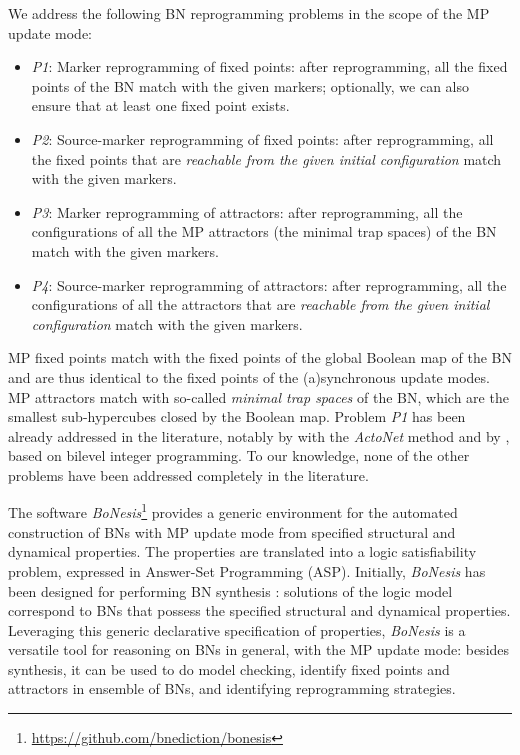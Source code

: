 \documentclass[PCJ,Unicode,screen,mode=plain]{cedram}
\begin{document}
We address the following BN reprogramming problems in the scope of the
MP update mode:

\begin{itemize}
\item
  \emph{P1}: Marker reprogramming of fixed points: after reprogramming,
  all the fixed points of the BN match with the given markers;
  optionally, we can also ensure that at least one fixed point exists.
\item
  \emph{P2}: Source-marker reprogramming of fixed points: after
  reprogramming, all the fixed points that are \emph{reachable from the
  given initial configuration} match with the given markers.
\item
  \emph{P3}: Marker reprogramming of attractors: after reprogramming,
  all the configurations of all the MP attractors (the minimal trap
  spaces) of the BN match with the given markers.
\item
  \emph{P4}: Source-marker reprogramming of attractors: after
  reprogramming, all the configurations of all the attractors that are
  \emph{reachable from the given initial configuration} match with the
  given markers.
\end{itemize}

MP fixed points match with the fixed points of the global Boolean map of
the BN and are thus identical to the fixed points of the (a)synchronous
update modes. MP attractors match with so-called \emph{minimal trap
spaces} of the BN, which are the smallest sub-hypercubes closed by the
Boolean map. Problem \emph{P1} has been already addressed in the
literature, notably by \citet{Biane2018} with the \emph{ActoNet} method
and by \citet{Moon22}, based on bilevel integer programming. To our
knowledge, none of the other problems have been addressed completely in
the literature.

The software \emph{BoNesis}\footnote{\url{https://github.com/bnediction/bonesis}}
provides a generic environment for the automated construction of BNs
with MP update mode from specified structural and dynamical properties.
The properties are translated into a logic satisfiability problem,
expressed in Answer-Set Programming (ASP). Initially, \emph{BoNesis} has
been designed for performing BN synthesis \citep{bn-synthesis-ICTAI19}:
solutions of the logic model correspond to BNs that possess the
specified structural and dynamical properties. Leveraging this generic
declarative specification of properties, \emph{BoNesis} is a versatile
tool for reasoning on BNs in general, with the MP update mode: besides
synthesis, it can be used to do model checking, identify fixed points
and attractors in ensemble of BNs, and identifying reprogramming
strategies.
\end{document}
